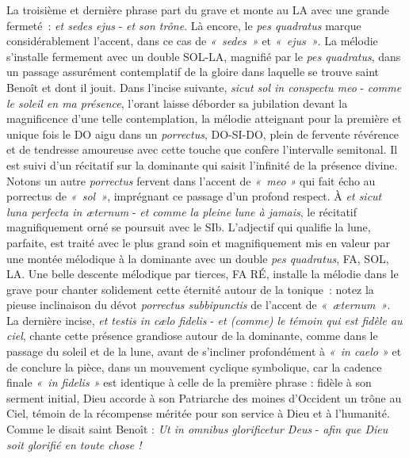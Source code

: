 \documentclass[Session2026.tex]{subfiles}
\begin{document}
La troisième et dernière phrase part du grave et monte au LA avec une
grande fermeté~: \emph{et sedes ejus} - \emph{et son trône}. Là encore,
le \emph{pes quadratus} marque considérablement l'accent, dans ce cas de
\emph{«~sedes~»} et \emph{«~ejus~»}. La mélodie s'installe fermement
avec un double SOL-LA, magnifié par le \emph{pes quadratus}, dans un
passage assurément contemplatif de la gloire dans laquelle se trouve
saint Benoît et dont il jouit. Dans l'incise suivante, \emph{sicut sol
in conspectu meo} - \emph{comme le soleil en ma présence}, l'orant
laisse déborder sa jubilation devant la magnificence d'une telle
contemplation, la mélodie atteignant pour la première et unique fois le
DO aigu dans un \emph{porrectus}, DO-SI-DO, plein de fervente révérence
et de tendresse amoureuse avec cette touche que confère l'intervalle
semitonal. Il est suivi d'un récitatif sur la dominante qui saisit
l'infinité de la présence divine. Notons un autre \emph{porrectus}
fervent dans l'accent de \emph{«~meo »} qui fait écho au porrectus de
\emph{«~sol~»}, imprégnant ce passage d'un profond respect. À \emph{et
sicut luna perfecta in æternum} - \emph{et comme la pleine lune à
jamais}, le récitatif magnifiquement orné se poursuit avec le SIb.
L'adjectif qui qualifie la lune, parfaite, est traité avec le plus grand
soin et magnifiquement mis en valeur par une montée mélodique à la
dominante avec un double \emph{pes quadratus}, FA, SOL, LA. Une belle
descente mélodique par tierces, FA RÉ, installe la mélodie dans le grave
pour chanter solidement cette éternité autour de la tonique~: notez la
pieuse inclinaison du dévot \emph{porrectus subbipunctis} de l'accent de
\emph{«~æternum~»}. La dernière incise, \emph{et testis in cælo fidelis}
- \emph{et (comme) le témoin qui est fidèle au ciel}, chante cette
présence grandiose autour de la dominante, comme dans le passage du
soleil et de la lune, avant de s'incliner profondément à \emph{«~in
caelo »} et de conclure la pièce, dans un mouvement cyclique symbolique,
car la cadence finale \emph{«~in fidelis »} est identique à celle de la
première phrase : fidèle à son serment initial, Dieu accorde à son
Patriarche des moines d'Occident un trône au Ciel, témoin de la
récompense méritée pour son service à Dieu et à l'humanité. Comme le
disait saint Benoît : \emph{Ut in omnibus glorificetur Deus} -
\emph{afin que Dieu soit glorifié en toute chose !}


\newpage %

\vspace*{2cm}
\setlength{\parskip}{0mm}
\end{document}
